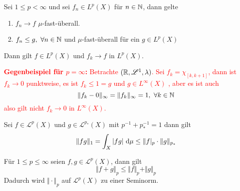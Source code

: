 \documentclass[a4paper,12pt]{scrartcl}
\begin{document}
    \begin{bem} Sei $1\le p<\infty$ und sei 
        $f_n\in L^p(X)$ für $n\in \mathbb{N}$, dann gelte
        \begin{enumerate}
            \item $f_n \to f$ $\mu$-fast-überall. 
            \item $f_n \le g, \ \forall n\in \mathbb{N}$ und $\mu$-fast-überall für ein $g\in L^p(X)$
        \end{enumerate}
        Dann gilt $f\in L^p(X)$ und $f_k \to f$ in $L^p(X)$.
    \end{bem}
    \textcolor{red}{\textbf{Gegenbeispiel für $p=\infty$:} Betrachte $(\mathbb{R}, \mathscr{L}^1, \lambda)$. Sei $f_k=\chi_{[k,k+1]}$, dann ist $f_k\to 0$ punktweise, es ist $f_k\le 1=g$ und $g\in L^\infty(X)$
    , aber es ist auch 
    \[
    \Vert f_k - 0\Vert_\infty = \Vert f_k\Vert_\infty = 1, \ \forall k\in \mathbb{N}    
    \]
    also gilt nicht $f_k\to 0$ in $L^\infty(X)$.}
    \begin{lemma} Sei $f\in \mathscr{L}^p(X)$ und $g\in\mathscr{L}^{p_*}(X)$ mit $p^{-1}+p_*^{-1}=1$ 
        dann gilt 
        \[
        \Vert fg\Vert_1 = \int_X \vert fg\vert \ \mathrm{d} \mu \le \Vert f\vert_p \cdot \Vert g\Vert_{p_*}     
        \]
    \end{lemma}
    \begin{lemma} Für $1\le p\le \infty$ seien $f,g\in \mathscr{L}^p(X)$, dann gilt 
        \[
        \Vert f+g\Vert_p \le \Vert f\Vert_p + \Vert g\Vert_p    
        \]
        Dadurch wird $\Vert\cdot\Vert_p$ auf $\mathscr{L}^p(X)$ zu einer Seminorm.
    \end{lemma}
\end{document}
